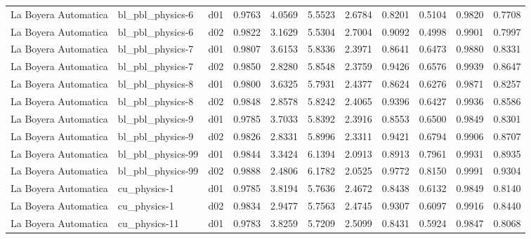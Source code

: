 \begin{longtable}{lllrrrrrrrr}
 La Boyera Automatica  &      bl\_pbl\_physics-6 &     d01 &   0.9763 &   4.0569 &   5.5523 &       2.6784 &        0.8201 &       0.5104 &           0.9820 &  0.7708 \\
 La Boyera Automatica  &      bl\_pbl\_physics-6 &     d02 &   0.9822 &   3.1629 &   5.5304 &       2.7004 &        0.9092 &       0.4998 &           0.9901 &  0.7997 \\
 La Boyera Automatica  &      bl\_pbl\_physics-7 &     d01 &   0.9807 &   3.6153 &   5.8336 &       2.3971 &        0.8641 &       0.6473 &           0.9880 &  0.8331 \\
 La Boyera Automatica  &      bl\_pbl\_physics-7 &     d02 &   0.9850 &   2.8280 &   5.8548 &       2.3759 &        0.9426 &       0.6576 &           0.9939 &  0.8647 \\
 La Boyera Automatica  &      bl\_pbl\_physics-8 &     d01 &   0.9800 &   3.6325 &   5.7931 &       2.4377 &        0.8624 &       0.6276 &           0.9871 &  0.8257 \\
 La Boyera Automatica  &      bl\_pbl\_physics-8 &     d02 &   0.9848 &   2.8578 &   5.8242 &       2.4065 &        0.9396 &       0.6427 &           0.9936 &  0.8586 \\
 La Boyera Automatica  &      bl\_pbl\_physics-9 &     d01 &   0.9785 &   3.7033 &   5.8392 &       2.3916 &        0.8553 &       0.6500 &           0.9849 &  0.8301 \\
 La Boyera Automatica  &      bl\_pbl\_physics-9 &     d02 &   0.9826 &   2.8331 &   5.8996 &       2.3311 &        0.9421 &       0.6794 &           0.9906 &  0.8707 \\
 La Boyera Automatica  &     bl\_pbl\_physics-99 &     d01 &   0.9844 &   3.3424 &   6.1394 &       2.0913 &        0.8913 &       0.7961 &           0.9931 &  0.8935 \\
 La Boyera Automatica  &     bl\_pbl\_physics-99 &     d02 &   0.9888 &   2.4806 &   6.1782 &       2.0525 &        0.9772 &       0.8150 &           0.9991 &  0.9304 \\
 La Boyera Automatica  &          cu\_physics-1 &     d01 &   0.9785 &   3.8194 &   5.7636 &       2.4672 &        0.8438 &       0.6132 &           0.9849 &  0.8140 \\
 La Boyera Automatica  &          cu\_physics-1 &     d02 &   0.9834 &   2.9477 &   5.7563 &       2.4745 &        0.9307 &       0.6097 &           0.9916 &  0.8440 \\
 La Boyera Automatica  &         cu\_physics-11 &     d01 &   0.9783 &   3.8259 &   5.7209 &       2.5099 &        0.8431 &       0.5924 &           0.9847 &  0.8068 \\

\end{longtable}
